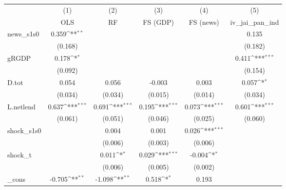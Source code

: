 {
\def\sym#1{\ifmmode^{#1}\else\(^{#1}\)\fi}
\begin{tabular}{l*{5}{c}}
\toprule
            &\multicolumn{1}{c}{(1)}&\multicolumn{1}{c}{(2)}&\multicolumn{1}{c}{(3)}&\multicolumn{1}{c}{(4)}&\multicolumn{1}{c}{(5)}\\
            &\multicolumn{1}{c}{OLS}&\multicolumn{1}{c}{RF}&\multicolumn{1}{c}{FS (GDP)}&\multicolumn{1}{c}{FS (news)}&\multicolumn{1}{c}{iv\_jai\_pan\_ind}\\
\midrule
news\_s1s0   &       0.359\sym{**} &                     &                     &                     &       0.135         \\
            &     (0.168)         &                     &                     &                     &     (0.182)         \\
\addlinespace
gRGDP       &       0.178\sym{*}  &                     &                     &                     &       0.411\sym{***}\\
            &     (0.092)         &                     &                     &                     &     (0.154)         \\
\addlinespace
D.tot       &       0.054         &       0.056         &      -0.003         &       0.003         &       0.057\sym{*}  \\
            &     (0.034)         &     (0.034)         &     (0.015)         &     (0.014)         &     (0.034)         \\
\addlinespace
L.netlend   &       0.637\sym{***}&       0.691\sym{***}&       0.195\sym{***}&       0.073\sym{***}&       0.601\sym{***}\\
            &     (0.061)         &     (0.051)         &     (0.046)         &     (0.025)         &     (0.060)         \\
\addlinespace
shock\_s1s0  &                     &       0.004         &       0.001         &       0.026\sym{***}&                     \\
            &                     &     (0.006)         &     (0.003)         &     (0.006)         &                     \\
\addlinespace
shock\_t     &                     &       0.011\sym{*}  &       0.029\sym{***}&      -0.004\sym{*}  &                     \\
            &                     &     (0.006)         &     (0.005)         &     (0.002)         &                     \\
\addlinespace
\_cons      &      -0.705\sym{**} &      -1.098\sym{**} &       0.518\sym{*}  &       0.193         &                     \\

\end{tabular}}
